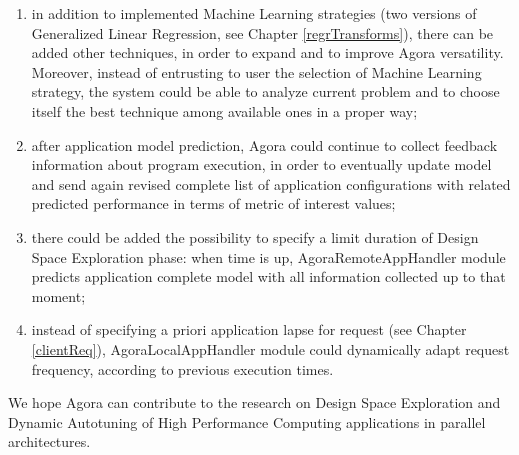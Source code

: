 \begin{enumerate}

	\item in addition to implemented Machine Learning strategies (two versions of Generalized Linear Regression, see Chapter \ref{regrTransforms}), there can be added other techniques, in order to expand and to improve Agora versatility. Moreover, instead of entrusting to user the selection of Machine Learning strategy, the system could be able to analyze current problem and to choose itself the best technique among available ones in a proper way;

	\item after application model prediction, Agora could continue to collect feedback information about program execution, in order to eventually update model and send again revised complete list of application configurations with related predicted performance in terms of metric of interest values;

	\item there could be added the possibility to specify a limit duration of Design Space Exploration phase: when time is up, AgoraRemoteAppHandler module predicts application complete model with all information collected up to that moment;

	\item instead of specifying a priori application lapse for request (see Chapter \ref{clientReq}), AgoraLocalAppHandler module could dynamically a\-dapt request frequency, according to previous execution times.

\end{enumerate}

We hope Agora can contribute to the research on Design Space Exploration and Dynamic Autotuning of High Performance Computing applications in parallel architectures.
